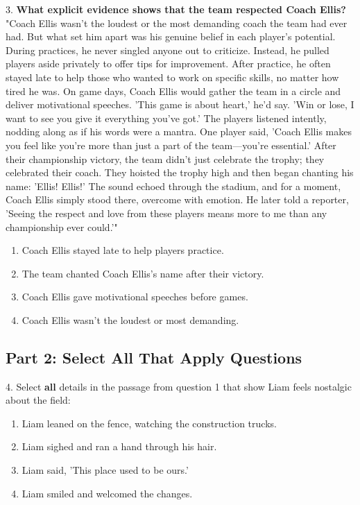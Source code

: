 \documentclass[12pt]{article}
\begin{document}
3. \textbf{What explicit evidence shows that the team respected Coach Ellis?}\\
"Coach Ellis wasn’t the loudest or the most demanding coach the team had ever had. But what set him apart was his genuine belief in each player’s potential. During practices, he never singled anyone out to criticize. Instead, he pulled players aside privately to offer tips for improvement. After practice, he often stayed late to help those who wanted to work on specific skills, no matter how tired he was. On game days, Coach Ellis would gather the team in a circle and deliver motivational speeches. 'This game is about heart,' he’d say. 'Win or lose, I want to see you give it everything you’ve got.' The players listened intently, nodding along as if his words were a mantra. One player said, 'Coach Ellis makes you feel like you’re more than just a part of the team—you’re essential.' After their championship victory, the team didn’t just celebrate the trophy; they celebrated their coach. They hoisted the trophy high and then began chanting his name: 'Ellis! Ellis!' The sound echoed through the stadium, and for a moment, Coach Ellis simply stood there, overcome with emotion. He later told a reporter, 'Seeing the respect and love from these players means more to me than any championship ever could.'"  
\begin{enumerate}[label=\Alph*.]
    \item Coach Ellis stayed late to help players practice.  
    \item The team chanted Coach Ellis's name after their victory.  
    \item Coach Ellis gave motivational speeches before games.  
    \item Coach Ellis wasn’t the loudest or most demanding.  
\end{enumerate}



\newpage
\subsection*{Part 2: Select All That Apply Questions}

4. Select \textbf{all} details in the passage from question 1 that show Liam feels nostalgic about the field:  
\begin{enumerate}[label=\Alph*.]
    \item Liam leaned on the fence, watching the construction trucks.  
    \item Liam sighed and ran a hand through his hair.  
    \item Liam said, 'This place used to be ours.'  
    \item Liam smiled and welcomed the changes.  
\end{enumerate}
\end{document}
